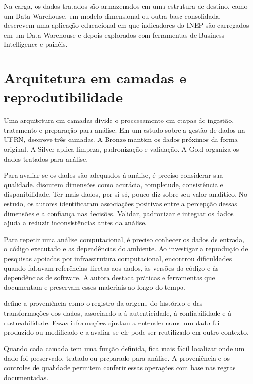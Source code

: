 Na carga, os dados tratados são armazenados em uma estrutura de destino, como um Data Warehouse, um modelo dimensional ou outra base consolidada.  descrevem uma aplicação educacional em que indicadores do INEP são carregados em um Data Warehouse e depois explorados com ferramentas de Business Intelligence e painéis.

\section{Arquitetura em camadas e reprodutibilidade}

Uma arquitetura em camadas divide o processamento em etapas de ingestão, tratamento e preparação para análise. Em um estudo sobre a gestão de dados na UFRN,  descreve três camadas. A Bronze mantém os dados próximos da forma original. A Silver aplica limpeza, padronização e validação. A Gold organiza os dados tratados para análise.

Para avaliar se os dados são adequados à análise, é preciso considerar sua qualidade.  discutem dimensões como acurácia, completude, consistência e disponibilidade. Ter mais dados, por si só, pouco diz sobre seu valor analítico. No estudo, os autores identificaram associações positivas entre a percepção dessas dimensões e a confiança nas decisões. Validar, padronizar e integrar os dados ajuda a reduzir inconsistências antes da análise.

Para repetir uma análise computacional, é preciso conhecer os dados de entrada, o código executado e as dependências do ambiente. Ao investigar a reprodução de pesquisas apoiadas por infraestrutura computacional,  encontrou dificuldades quando faltavam referências diretas aos dados, às versões do código e às dependências de software. A autora destaca práticas e ferramentas que documentam e preservam esses materiais ao longo do tempo.

 define a proveniência como o registro da origem, do histórico e das transformações dos dados, associando-a à autenticidade, à confiabilidade e à rastreabilidade. Essas informações ajudam a entender como um dado foi produzido ou modificado e a avaliar se ele pode ser reutilizado em outro contexto.

Quando cada camada tem uma função definida, fica mais fácil localizar onde um dado foi preservado, tratado ou preparado para análise. A proveniência e os controles de qualidade permitem conferir essas operações com base nas regras documentadas.

